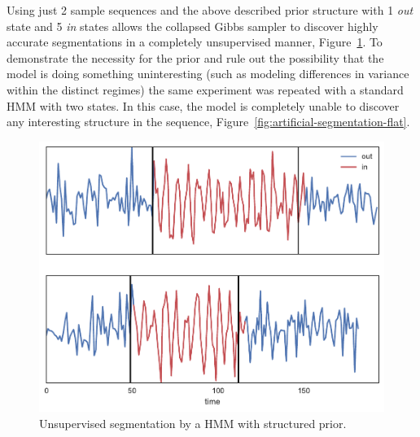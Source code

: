 \documentclass[12pt]{report}
\newcommand{\1}[0]{\mathbbm{1}}
\begin{document}
Using just 2 sample sequences and the above described prior structure with
1 \emph{out} state and 5 \emph{in} states allows the collapsed Gibbs sampler
to discover highly accurate segmentations in a completely unsupervised manner,
Figure~\ref{fig:artificial-segmentation-struct}. To demonstrate the necessity for the prior
and rule out the possibility that the model is doing something uninteresting (such
as modeling differences in variance within the distinct regimes) the same experiment
was repeated with a standard \ac{HMM} with two states. In this case, the model is completely
unable to discover any interesting structure in the sequence,
Figure~\ref{fig:artificial-segmentation-flat}.

\begin{figure}[H]
    \centering
    \includegraphics[width=1\textwidth]{img/artificial-segment-output-struct.pdf}
    \caption[Example segmentation of synthetic sequences with structure]{
        Unsupervised segmentation by a HMM with structured prior.
    }
    \label{fig:artificial-segmentation-struct}
\end{figure}
\end{document}
